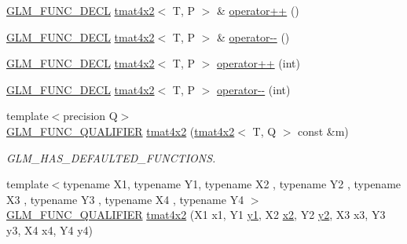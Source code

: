 \begin{DoxyCompactItemize}
\item 
\mbox{\hyperlink{setup_8hpp_ab2d052de21a70539923e9bcbf6e83a51}{G\+L\+M\+\_\+\+F\+U\+N\+C\+\_\+\+D\+E\+CL}} \mbox{\hyperlink{structglm_1_1tmat4x2}{tmat4x2}}$<$ T, P $>$ \& \mbox{\hyperlink{structglm_1_1tmat4x2_aa4dfd99c24f9e86e7b3de9c0a2cb99ab}{operator++}} ()
\item 
\mbox{\hyperlink{setup_8hpp_ab2d052de21a70539923e9bcbf6e83a51}{G\+L\+M\+\_\+\+F\+U\+N\+C\+\_\+\+D\+E\+CL}} \mbox{\hyperlink{structglm_1_1tmat4x2}{tmat4x2}}$<$ T, P $>$ \& \mbox{\hyperlink{structglm_1_1tmat4x2_acb22e08a3abe9442d718346508b76681}{operator-\/-\/}} ()
\item 
\mbox{\hyperlink{setup_8hpp_ab2d052de21a70539923e9bcbf6e83a51}{G\+L\+M\+\_\+\+F\+U\+N\+C\+\_\+\+D\+E\+CL}} \mbox{\hyperlink{structglm_1_1tmat4x2}{tmat4x2}}$<$ T, P $>$ \mbox{\hyperlink{structglm_1_1tmat4x2_af0211253087f7df4afb95aeba8daef24}{operator++}} (int)
\item 
\mbox{\hyperlink{setup_8hpp_ab2d052de21a70539923e9bcbf6e83a51}{G\+L\+M\+\_\+\+F\+U\+N\+C\+\_\+\+D\+E\+CL}} \mbox{\hyperlink{structglm_1_1tmat4x2}{tmat4x2}}$<$ T, P $>$ \mbox{\hyperlink{structglm_1_1tmat4x2_a6e82215ef61cf4f3b4a1cf3bfe21d6fc}{operator-\/-\/}} (int)
\item 
{\footnotesize template$<$precision Q$>$ }\\\mbox{\hyperlink{setup_8hpp_a33fdea6f91c5f834105f7415e2a64407}{G\+L\+M\+\_\+\+F\+U\+N\+C\+\_\+\+Q\+U\+A\+L\+I\+F\+I\+ER}} \mbox{\hyperlink{structglm_1_1tmat4x2_aabba725bdf197091f8eab5a583201fca}{tmat4x2}} (\mbox{\hyperlink{structglm_1_1tmat4x2}{tmat4x2}}$<$ T, Q $>$ const \&m)
\begin{DoxyCompactList}\small\item\em G\+L\+M\+\_\+\+H\+A\+S\+\_\+\+D\+E\+F\+A\+U\+L\+T\+E\+D\+\_\+\+F\+U\+N\+C\+T\+I\+O\+NS. \end{DoxyCompactList}\item 
{\footnotesize template$<$typename X1, typename Y1, typename X2 , typename Y2 , typename X3 , typename Y3 , typename X4 , typename Y4 $>$ }\\\mbox{\hyperlink{setup_8hpp_a33fdea6f91c5f834105f7415e2a64407}{G\+L\+M\+\_\+\+F\+U\+N\+C\+\_\+\+Q\+U\+A\+L\+I\+F\+I\+ER}} \mbox{\hyperlink{structglm_1_1tmat4x2_af1595b0913a2bc31ff60ab847a351d4e}{tmat4x2}} (X1 x1, Y1 \mbox{\hyperlink{glad_8h_a48340161068d267815ac3131e9d03def}{y1}}, X2 \mbox{\hyperlink{glad_8h_ad2cea6eadb01f017f0d57e7edf0ce988}{x2}}, Y2 \mbox{\hyperlink{glad_8h_af7158b5d27f7a6aa4ab9973fcc3a5c20}{y2}}, X3 x3, Y3 y3, X4 x4, Y4 y4)
\item 

\end{DoxyCompactItemize}

